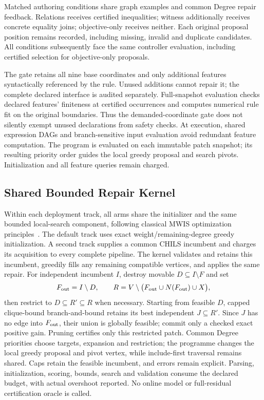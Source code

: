 Matched authoring conditions share graph examples and common Degree repair
feedback. Relations receives certified inequalities; witness additionally
receives concrete equality joins; objective-only receives neither. Each
original proposal position remains recorded, including missing, invalid and
duplicate candidates. All conditions subsequently face the same controller
evaluation, including certified selection for objective-only proposals.

The gate retains all nine base coordinates and only additional features
syntactically referenced by the rule. Unused additions cannot repair it;
the complete declared interface is audited separately. Full-snapshot
evaluation checks declared features' finiteness at certified occurrences and
computes numerical rule fit on the original boundaries. Thus the demanded-coordinate gate
does not silently exempt unused declarations from safety checks. At execution,
shared expression DAGs and branch-sensitive input evaluation avoid redundant
feature computation. The program is evaluated on each immutable patch
snapshot; its resulting priority order guides the local greedy proposal and
search pivots. Initialization and all feature queries remain charged.

\subsection{Shared Bounded Repair Kernel}
\label{sec:method:execution}
Within each deployment track, all arms share the initializer and the same
bounded local-search component, following classical
MWIS optimization principles~\cite{lamm2019weighted,gellner2021struction,grossmann2024mmwis,grossmann2025chils}.
The default track uses exact weight/remaining-degree greedy initialization.
A second track supplies a common CHILS incumbent and charges its acquisition
to every complete pipeline. The kernel validates and retains this incumbent,
greedily fills any remaining compatible vertices, and applies the same repair.
For independent incumbent $I$, destroy movable $D\subseteq I\setminus F$ and set
\begin{equation}
 F_{\rm out}=I\setminus D,\qquad
 R=V\setminus\bigl(F_{\rm out}\cup N(F_{\rm out})\cup X\bigr),
 \label{eq:repair-region}
\end{equation}
then restrict to $D\subseteq R'\subseteq R$ when necessary. Starting from
feasible $D$, capped clique-bound branch-and-bound retains its best independent
$J\subseteq R'$. Since $J$ has no edge into $F_{\rm out}$, their union is
globally feasible; commit only a checked exact positive gain. Pruning certifies
only this restricted patch. Common Degree priorities choose targets, expansion
and restriction; the programme changes the local greedy proposal and pivot
vertex, while include-first traversal remains shared. Caps retain the feasible
incumbent, and errors remain explicit. Parsing, initialization, scoring, bounds,
search and validation consume the declared budget, with actual overshoot
reported. No online model or full-residual certification oracle is called.


